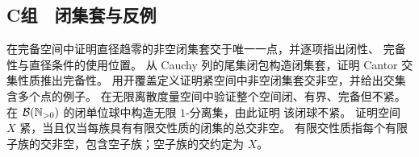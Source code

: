 \subsection*{C组　闭集套与反例}
\begin{enumerate}[label=\textbf{\thechapter.\arabic*.},resume]
 在完备空间中证明直径趋零的非空闭集套交于唯一一点，并逐项指出闭性、
 完备性与直径条件的使用位置。
 从 Cauchy 列的尾集闭包构造闭集套，证明 Cantor 交集性质推出完备性。
 用开覆盖定义证明紧空间中非空闭集套交非空，并给出交集含多个点的例子。
 在无限离散度量空间中验证整个空间闭、有界、完备但不紧。
 在 \(\mathcal B(\mathbb{N}_{>0})\) 的闭单位球中构造无限 \(1\)-分离集，由此证明
 该闭球不紧。
 证明空间 \(X\) 紧，当且仅当每族具有有限交性质的闭集的总交非空。
 有限交性质指每个有限子族的交非空，包含空子族；空子族的交约定为 \(X\)。
\end{enumerate}

